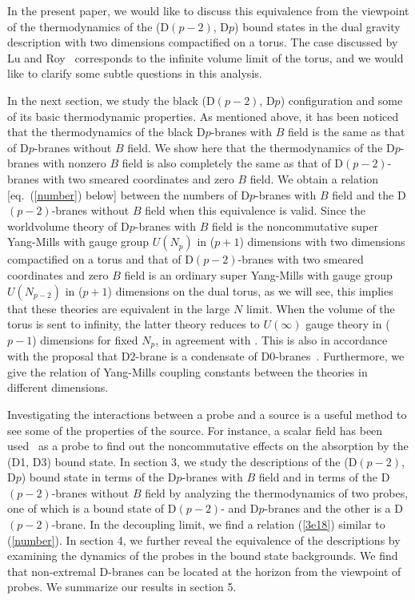 \documentclass[a4paper,12pt]{article}
\begin{document}
In the present paper, we would like to discuss this equivalence from the
viewpoint of the thermodynamics of the (D$(p-2)$, D$p$) bound states
in the dual gravity description with two dimensions compactified on a torus.
The case discussed by Lu and Roy~\cite{Lu} corresponds to the infinite
volume limit of the torus, and we would like to clarify some subtle questions
in this analysis.

In the next section, we study the black (D$(p-2)$, D$p$) configuration and
some of its basic thermodynamic properties. As mentioned above, it has been
noticed that the thermodynamics of the black D$p$-branes with $B$ field is
the same as that of D$p$-branes without $B$ field. We show here that the
thermodynamics of the D$p$-branes with nonzero $B$ field is also completely
the same as that of D$(p-2)$-branes with two smeared coordinates and zero
$B$ field. We obtain a relation [eq.~(\ref{number}) below] between
the numbers of D$p$-branes with $B$ field and the D$(p-2)$-branes without
$B$ field when this equivalence is valid. Since the worldvolume theory of
D$p$-branes with $B$ field is the noncommutative super Yang-Mills with gauge
group $U(N_p)$ in ($p+1$) dimensions with two dimensions compactified on
a torus and that of D$(p-2)$-branes with two smeared coordinates and zero $B$
field is an ordinary super Yang-Mills with gauge group $U(N_{p-2})$ in ($p+1$)
dimensions on the dual torus, as we will see, this implies that these
theories are equivalent in the large $N$ limit. When the volume of the torus
is sent to infinity, the latter theory reduces to $U(\infty)$ gauge theory
in ($p-1$) dimensions for fixed $N_p$, in agreement with \cite{Lu}.
This is also in accordance with the proposal that D2-brane is a condensate
of D0-branes~\cite{T,Ishibashi1,Ishibashi2}. Furthermore, we give the
relation of Yang-Mills coupling constants between the theories in different
dimensions.

Investigating the interactions between a probe and a source is a useful
method to see some of the properties of the source. For instance, a scalar
field has been used~\cite{Kaya,Myung1,Myung2} as a probe to find out the
noncommutative effects on the absorption by the (D1, D3) bound state.
In section 3, we study the descriptions of the (D$(p-2)$, D$p$) bound
state in terms of the D$p$-branes with $B$ field and in terms of the
D$(p-2)$-branes without $B$ field by analyzing the thermodynamics of two
probes, one of which is a bound state of D$(p-2)$- and D$p$-branes and the
other is a D$(p-2)$-brane. In the decoupling limit, we find a relation
(\ref{3e18}) similar to (\ref{number}). In section 4, we further
reveal the equivalence of the descriptions by examining the dynamics of
the probes in the bound state backgrounds. We find that non-extremal
D-branes can be located at the horizon from the viewpoint of probes.
We summarize our results in section 5.
\end{document}
